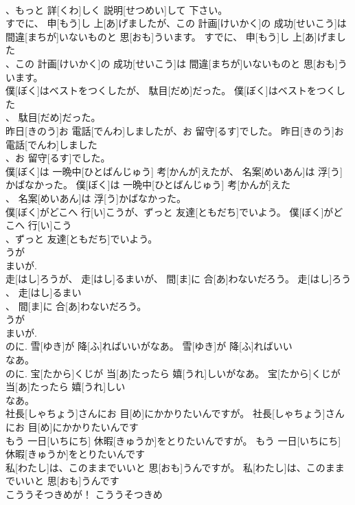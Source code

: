 \documentclass[8pt]{extreport}
\begin{document}
\begin{CJK}{UTF8}{min}
\\	、もっと 詳[くわ]しく 説明[せつめい]して 下さい。	
\\	すでに、 申[もう]し 上[あ]げましたが、この 計画[けいかく]の 成功[せいこう]は 間違[まちが]いないものと 思[おも]ういます。	すでに、 申[もう]し 上[あ]げました
\\	、この 計画[けいかく]の 成功[せいこう]は 間違[まちが]いないものと 思[おも]ういます。	
\\	僕[ぼく]はベストをつくしたが、 駄目[だめ]だった。	僕[ぼく]はベストをつくした
\\	、 駄目[だめ]だった。	
\\	昨日[きのう]お 電話[でんわ]しましたが、お 留守[るす]でした。	昨日[きのう]お 電話[でんわ]しました
\\	、お 留守[るす]でした。	
\\	僕[ぼく]は 一晩中[ひとばんじゅう] 考[かんが]えたが、 名案[めいあん]は 浮[う]かばなかった。	僕[ぼく]は 一晩中[ひとばんじゅう] 考[かんが]えた
\\	、 名案[めいあん]は 浮[う]かばなかった。	
\\	僕[ぼく]がどこへ 行[い]こうが、ずっと 友達[ともだち]でいよう。	僕[ぼく]がどこへ 行[い]こう
\\	、ずっと 友達[ともだち]でいよう。	
\\	うが
\\	まいが.
\\	走[はし]ろうが、 走[はし]るまいが、 間[ま]に 合[あ]わないだろう。	走[はし]ろう
\\	、 走[はし]るまい
\\	、 間[ま]に 合[あ]わないだろう。	
\\	うが
\\	まいが.
\\	のに.	雪[ゆき]が 降[ふ]ればいいがなあ。	雪[ゆき]が 降[ふ]ればいい
\\	なあ。	
\\	のに.	宝[たから]くじが 当[あ]たったら 嬉[うれ]しいがなあ。	宝[たから]くじが 当[あ]たったら 嬉[うれ]しい
\\	なあ。	
\\	社長[しゃちょう]さんにお 目[め]にかかりたいんですが。	社長[しゃちょう]さんにお 目[め]にかかりたいんです
\\	もう 一日[いちにち] 休暇[きゅうか]をとりたいんですが。	もう 一日[いちにち] 休暇[きゅうか]をとりたいんです
\\	私[わたし]は、このままでいいと 思[おも]うんですが。	私[わたし]は、このままでいいと 思[おも]うんです
\\	こううそつきめが！	こううそつきめ

\end{CJK}
\end{document}
